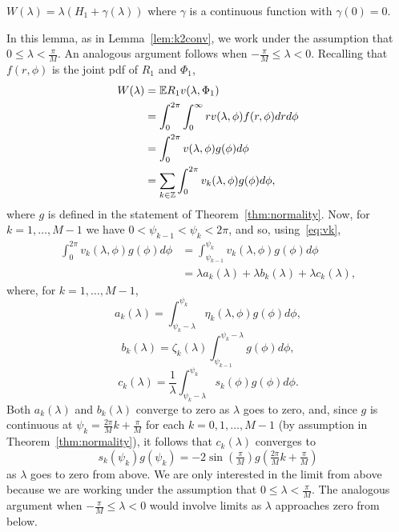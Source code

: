 \documentclass[journal]{IEEEtran}
\begin{document}
\begin{lemma}\label{lem:expRvlamphi}
$W(\lambda) =  \lambda(H_1 + \gamma(\lambda))$ where $\gamma$ is a continuous function with $\gamma(0) = 0$.
\end{lemma}
\begin{IEEEproof}
In this lemma, as in Lemma~\ref{lem:k2conv}, we work under the assumption that $0 \leq \lambda < \frac{\pi}{M}$.  An analogous argument follows when $-\tfrac{\pi}{M} \leq \lambda < 0$.  Recalling that $f(r,\phi)$ is the joint pdf of $R_1$ and $\Phi_1$, 
\begin{align}
W(\lambda) &= {\mathbb E} R_1 v(\lambda, \Phi_1) \nonumber  \\
&= \int_0^{2\pi}\int_{0}^\infty r v(\lambda, \phi) f(r,\phi) dr d\phi \nonumber  \\ 
&= \int_0^{2\pi} v(\lambda, \phi) g(\phi) d\phi \nonumber \\
&= \sum_{k \in {\mathbb Z}} \int_0^{2\pi} v_k(\lambda, \phi) g(\phi) d\phi, \label{eq:Winfsum}
\end{align}
where $g$ is defined in the statement of Theorem~\ref{thm:normality}.
Now, for $k = 1, \dots, M-1$ we have $0 < \psi_{k-1} < \psi_k < 2\pi$, and so, using~\eqref{eq:vk},
\begin{align*}
\int_0^{2\pi} v_k(\lambda, \phi) g(\phi) d\phi &= \int_{\psi_{k-1}}^{\psi_{k}} v_k(\lambda, \phi) g(\phi) d\phi \\
&= \lambda a_k(\lambda) + \lambda b_k(\lambda) + \lambda c_k(\lambda),
\end{align*}
where, for $k = 1, \dots, M-1$,
\begin{equation}\label{eq:ak}
a_k(\lambda) = \int_{\psi_k-\lambda}^{\psi_k}\eta_k(\lambda, \phi) g(\phi) d\phi,
\end{equation}
\[
b_k(\lambda) = \zeta_k(\lambda) \int_{\psi_{k-1}}^{\psi_k -\lambda}g(\phi) d\phi,
\]
\begin{equation}\label{eq:ck}
c_k(\lambda) = \frac{1}{\lambda} \int_{\psi_{k} - \lambda}^{\psi_{k}} s_k(\phi) g(\phi) d\phi.
\end{equation}
Both $a_k(\lambda)$ and $b_k(\lambda)$ converge to zero as $\lambda$ goes to zero, and, since $g$ is continuous at $\psi_k = \tfrac{2\pi}{M}k + \tfrac{\pi}{M}$ for each $k = 0, 1, \dots, M-1$ (by assumption in Theorem~\ref{thm:normality}), it follows that $c_k(\lambda)$ converges to 
\[
s_k(\psi_k)g(\psi_k) = -2\sin(\tfrac{\pi}{M}) g(\tfrac{2\pi}{M}k + \tfrac{\pi}{M})
\]
as $\lambda$ goes to zero from above.  We are only interested in the limit from above because we are working under the assumption that $0 \leq \lambda < \frac{\pi}{M}$.  The analogous argument when $-\tfrac{\pi}{M} \leq \lambda < 0$ would involve limits as $\lambda$ approaches zero from below.


\end{IEEEproof}
\end{document}
